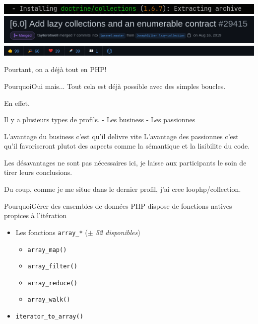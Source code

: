 \begin{frame}
    \includegraphics[width=\textwidth]{screenshots/Screenshot_20210520_104535.png}
    \pause
    \includegraphics[width=\textwidth]{screenshots/Screenshot_20210520_101402.png}
    \includegraphics[width=\textwidth]{screenshots/Screenshot_20210520_101458.png}
\end{frame}

\begin{frameC}{Pourtant, on a déjà tout en PHP!}

\end{frameC}

\begin{frame}{Pourquoi}{Oui mais...}
    Tout cela est déjà possible avec des simples boucles.

    En effet.

    Il y a plusieurs types de profils.
    - Les business
    - Les passionnes

    L'avantage du business c'est qu'il delivre vite
    L'avantage des passionnes c'est qu'il favoriseront plutot
    des aspects comme la sémantique et la lisibilite du code.

    Les désavantages ne sont pas nécessaires ici, je laisse aux
    participants le soin de tirer leurs conclusions.

    Du coup, comme je me situe dans le dernier profil, j'ai cree
    loophp/collection.
\end{frame}

\begin{frame}{Pourquoi}{Gérer des ensembles de données}
    PHP dispose de fonctions natives propices à l'itération

    \begin{itemize}[<+->]
        \item Les fonctions \texttt{array\_*} (\textit{$\pm$ 52 disponibles})
        \begin{itemize}[<+->]
            \item \texttt{array\_map()}
            \item \texttt{array\_filter()}
            \item \texttt{array\_reduce()}
            \item \texttt{array\_walk()}
        \end{itemize}
    \item \texttt{iterator\_to\_array()}
    \end{itemize}
\end{frame}

